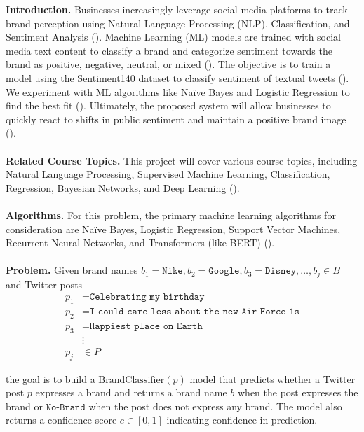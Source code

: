 \documentclass{article}
\begin{document}

\textbf{Introduction.} Businesses increasingly leverage social media platforms to track brand perception using Natural Language Processing (NLP), Classification, and Sentiment Analysis (\cite{colleoni2011measuring, benedetto2016big}). Machine Learning (ML) models are trained with social media text content to classify a brand and categorize sentiment towards the brand as positive, negative, neutral, or mixed (\cite{alessia2015approaches, anupama2020real, vidya2015twitter}). The objective is to train a model using the Sentiment140 dataset to classify sentiment of textual tweets (\cite{go2009twitter, pak2010twitter}). We experiment with ML algorithms like Naïve Bayes and Logistic Regression to find the best fit (\cite{howard2018universal}). Ultimately, the proposed system will allow businesses to quickly react to shifts in public sentiment and maintain a positive brand image (\cite{vidya2015twitter, petasis2013large, ducange2019effective}). \\
\\
\textbf{Related Course Topics.} This project will cover various course topics, including Natural Language Processing, Supervised Machine Learning, Classification, Regression, Bayesian Networks, and Deep Learning (\cite{severyn2015twitter, liu2020aspect, socher2013recursive}).\\
\\
\textbf{Algorithms.} For this problem, the primary machine learning algorithms for consideration are Naïve Bayes, Logistic Regression, Support Vector Machines, Recurrent Neural Networks, and Transformers (like BERT) (\cite{DBLP:journals/corr/abs-1810-04805}).\\
\\
\textbf{Problem.} Given brand names $b_1 = \texttt{Nike}, b_2 = \texttt{Google}, b_3 = \texttt{Disney}, \dots, b_j \in B$ and Twitter posts
\begin{align*}
    p_1 & = \texttt{Celebrating my birthday}                      \\
    p_2 & = \texttt{I could care less about the new Air Force 1s} \\
    p_3 & = \texttt{Happiest place on Earth}                      \\
        & \vdots                                                  \\
    p_j & \in P
\end{align*}

the goal is to build a $\mathrm{BrandClassifier}(p)$ model that predicts whether a Twitter post $p$ expresses a brand and returns a brand name $b$ when the post expresses the brand or $\texttt{No-Brand}$ when the post does not express any brand. The model also returns a confidence score $c \in [0, 1]$ indicating confidence in prediction.
\end{document}

